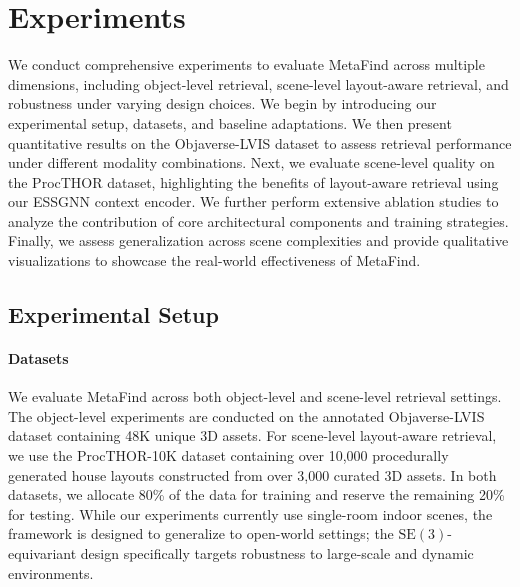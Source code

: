 \section{Experiments}
\label{sec:experiments}
We conduct comprehensive experiments to evaluate MetaFind across multiple dimensions, including object-level retrieval, scene-level layout-aware retrieval, and robustness under varying design choices. We begin by introducing our experimental setup, datasets, and baseline adaptations. We then present quantitative results on the Objaverse-LVIS dataset to assess retrieval performance under different modality combinations. Next, we evaluate scene-level quality on the ProcTHOR dataset, highlighting the benefits of layout-aware retrieval using our ESSGNN context encoder. We further perform extensive ablation studies to analyze the contribution of core architectural components and training strategies. Finally, we assess generalization across scene complexities and provide qualitative visualizations to showcase the real-world effectiveness of MetaFind.
\subsection{Experimental Setup}
\paragraph{Datasets} We evaluate MetaFind across both object-level and scene-level retrieval settings. The object-level experiments are conducted on the annotated Objaverse-LVIS dataset containing 48K unique 3D assets. For scene-level layout-aware retrieval, we use the ProcTHOR-10K dataset containing over 10,000 procedurally generated house layouts constructed from over 3,000 curated 3D assets. In both datasets, we allocate 80\% of the data for training and reserve the remaining 20\% for testing. While our experiments currently use single-room indoor scenes, the framework is designed to generalize to open-world settings; the $\mathrm{SE}(3)$-equivariant design specifically targets robustness to large-scale and dynamic environments.
